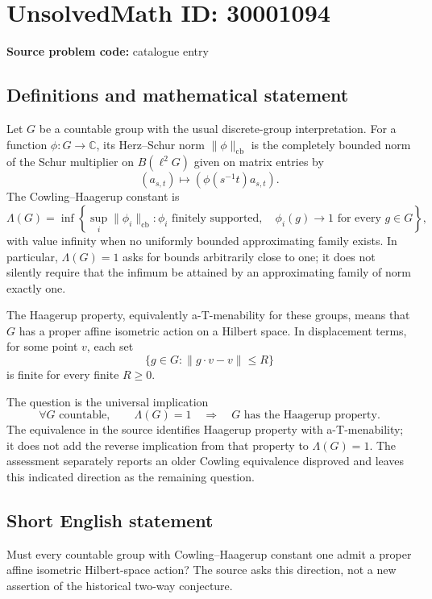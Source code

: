 \documentclass[11pt]{article}
\newcommand{\C}{\mathbb{C}}
\begin{document}
\section*{UnsolvedMath ID: 30001094}
\textbf{Source problem code:} catalogue entry
\subsection{Definitions and mathematical statement}
Let \(G\) be a countable group with the usual discrete-group interpretation. For a function \(\phi:G\to\C\), its Herz--Schur norm \(\|\phi\|_{\mathrm{cb}}\) is the completely bounded norm of the Schur multiplier on \(B(\ell^2G)\) given on matrix entries by
\[
(a_{s,t})\longmapsto(\phi(s^{-1}t)a_{s,t}).
\]
The Cowling--Haagerup constant is
\[
\Lambda(G)=\inf\left\{\sup_i\|\phi_i\|_{\mathrm{cb}}:
\phi_i\text{ finitely supported},\quad
\phi_i(g)\to1\text{ for every }g\in G\right\},
\]
with value infinity when no uniformly bounded approximating family exists. In particular, \(\Lambda(G)=1\) asks for bounds arbitrarily close to one; it does not silently require that the infimum be attained by an approximating family of norm exactly one.

The Haagerup property, equivalently a-T-menability for these groups, means that \(G\) has a proper affine isometric action on a Hilbert space. In displacement terms, for some point \(v\), each set
\[
\{g\in G:\|g\cdot v-v\|\leq R\}
\]
is finite for every finite \(R\geq0\).

The question is the universal implication
\[
\forall G\text{ countable},\qquad
\Lambda(G)=1\quad\Longrightarrow\quad
G\text{ has the Haagerup property}.
\]
The equivalence in the source identifies Haagerup property with a-T-menability; it does not add the reverse implication from that property to \(\Lambda(G)=1\). The assessment separately reports an older Cowling equivalence disproved and leaves this indicated direction as the remaining question.
\subsection{Short English statement}
Must every countable group with Cowling--Haagerup constant one admit a proper affine isometric Hilbert-space action? The source asks this direction, not a new assertion of the historical two-way conjecture.
\end{document}
